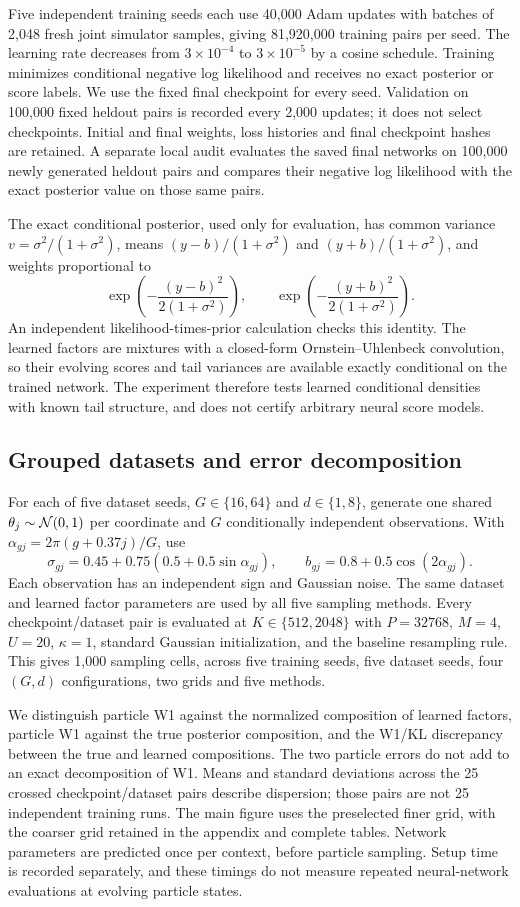 Five independent training seeds each use 40,000 Adam updates with batches of 2,048 fresh joint simulator samples, giving 81,920,000 training pairs per seed. The learning rate decreases from $3\times10^{-4}$ to $3\times10^{-5}$ by a cosine schedule. Training minimizes conditional negative log likelihood and receives no exact posterior or score labels. We use the fixed final checkpoint for every seed. Validation on 100,000 fixed heldout pairs is recorded every 2,000 updates; it does not select checkpoints. Initial and final weights, loss histories and final checkpoint hashes are retained. A separate local audit evaluates the saved final networks on 100,000 newly generated heldout pairs and compares their negative log likelihood with the exact posterior value on those same pairs.

The exact conditional posterior, used only for evaluation, has common variance $v=\sigma^2/(1+\sigma^2)$, means $(y-b)/(1+\sigma^2)$ and $(y+b)/(1+\sigma^2)$, and weights proportional to
\[
 \exp\!\left(-\frac{(y-b)^2}{2(1+\sigma^2)}\right),\qquad
 \exp\!\left(-\frac{(y+b)^2}{2(1+\sigma^2)}\right).
\]
An independent likelihood-times-prior calculation checks this identity. The learned factors are mixtures with a closed-form Ornstein--Uhlenbeck convolution, so their evolving scores and tail variances are available exactly conditional on the trained network. The experiment therefore tests learned conditional densities with known tail structure, and does not certify arbitrary neural score models.

\subsection{Grouped datasets and error decomposition}
For each of five dataset seeds, $G\in\{16,64\}$ and $d\in\{1,8\}$, generate one shared $\theta_j\sim\mathcal N(0,1)$ per coordinate and $G$ conditionally independent observations. With $\alpha_{gj}=2\pi(g+0.37j)/G$, use
\[
 \sigma_{gj}=0.45+0.75(0.5+0.5\sin\alpha_{gj}),\qquad
 b_{gj}=0.8+0.5\cos(2\alpha_{gj}).
\]
Each observation has an independent sign and Gaussian noise. The same dataset and learned factor parameters are used by all five sampling methods. Every checkpoint/dataset pair is evaluated at $K\in\{512,2048\}$ with $P=32768$, $M=4$, $U=20$, $\kappa=1$, standard Gaussian initialization, and the baseline resampling rule. This gives 1,000 sampling cells, across five training seeds, five dataset seeds, four $(G,d)$ configurations, two grids and five methods.

We distinguish particle W1 against the normalized composition of learned factors, particle W1 against the true posterior composition, and the W1/KL discrepancy between the true and learned compositions. The two particle errors do not add to an exact decomposition of W1. Means and standard deviations across the 25 crossed checkpoint/dataset pairs describe dispersion; those pairs are not 25 independent training runs. The main figure uses the preselected finer grid, with the coarser grid retained in the appendix and complete tables. Network parameters are predicted once per context, before particle sampling. Setup time is recorded separately, and these timings do not measure repeated neural-network evaluations at evolving particle states.
